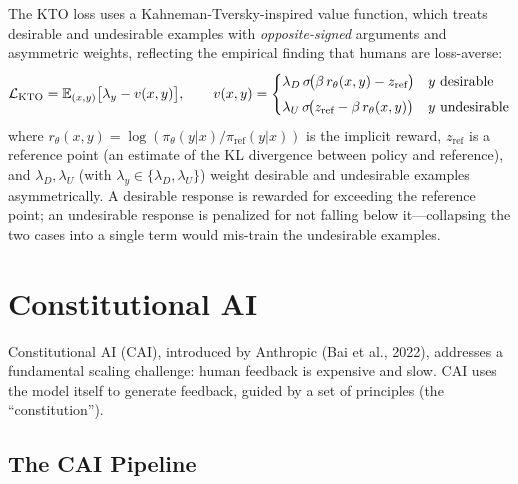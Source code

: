 The KTO loss uses a Kahneman-Tversky-inspired value function, which treats
desirable and undesirable examples with \emph{opposite-signed} arguments and
asymmetric weights, reflecting the empirical finding that humans are
loss-averse:
\begin{equation}
\mathcal{L}_{\text{KTO}} = \operatorname{\mathbb{E}}_{(x,y)} \bigl[ \lambda_y - v(x, y) \bigr],
\qquad
v(x, y) =
\begin{cases}
  \lambda_D \, \sigma\!\bigl(\beta \, r_\theta(x, y) - z_{\text{ref}}\bigr)
    & y \text{ desirable} \\[4pt]
  \lambda_U \, \sigma\!\bigl(z_{\text{ref}} - \beta \, r_\theta(x, y)\bigr)
    & y \text{ undesirable}
\end{cases}
\end{equation}
where $r_\theta(x, y) = \log(\pi_\theta(y|x) / \pi_{\text{ref}}(y|x))$
is the implicit reward, $z_{\text{ref}}$ is a reference point (an estimate
of the KL divergence between policy and reference), and
$\lambda_D, \lambda_U$ (with $\lambda_y \in \{\lambda_D, \lambda_U\}$)
weight desirable and undesirable examples asymmetrically.  A desirable
response is rewarded for exceeding the reference point; an undesirable
response is penalized for not falling below it---collapsing the two cases
into a single term would mis-train the undesirable examples.


\section{Constitutional AI}
\label{sec:cai}

Constitutional AI (CAI), introduced by Anthropic (Bai et al., 2022),
addresses a fundamental scaling challenge: human feedback is expensive
and slow.  CAI uses the model itself to generate feedback, guided by a
set of principles (the ``constitution'').

\subsection{The CAI Pipeline}

